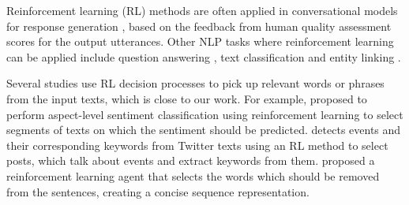 Reinforcement learning (RL) methods are often applied in conversational models for response generation \cite{kandasamy2017batch}, based on the feedback from human quality assessment scores for the output utterances. Other NLP tasks where reinforcement learning can be applied include question answering \cite{qu2019learning, liu2020knowledge}, text classification \cite{zhang2018learning} and entity linking \cite{fang2019joint}. 

Several studies use RL decision processes to pick up relevant words or phrases from the input texts, which is close to our work. For example, \citet{wang2019aspect} proposed to perform aspect-level sentiment classification using reinforcement learning to select segments of texts on which the sentiment should be predicted. \citet{chen2018joint} detects events and their corresponding keywords from Twitter texts using an RL method to select posts, which talk about events and extract keywords from them. \citet{zhang2018learning} proposed a reinforcement learning agent that selects the words which should be removed from the sentences, creating a concise sequence representation. %


